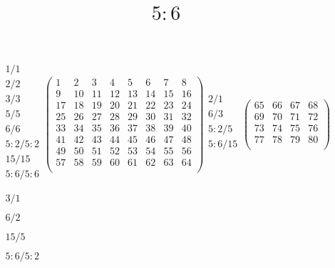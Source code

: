 \documentclass[12pt,a4paper]{amsart}
\title{$5:6$}
\begin{document}
\maketitle

\begin{align*}
\begin{array}{r}%
1/1\\%
2/2\\%
3/3\\%
5/5\\%
6/6\\%
5:2/5:2\\%
15/15\\%
5:6/5:6\\%
\end{array}%
\left(\begin{array}{r|r|r|r|r|r|r|r}%
1&2&3&4&5&6&7&8\\\hline%
9&10&11&12&13&14&15&16\\\hline%
17&18&19&20&21&22&23&24\\\hline%
25&26&27&28&29&30&31&32\\\hline%
33&34&35&36&37&38&39&40\\\hline%
41&42&43&44&45&46&47&48\\\hline%
49&50&51&52&53&54&55&56\\\hline%
57&58&59&60&61&62&63&64\\%
\end{array}\right)%
%
\begin{array}{r}%
2/1\\%
6/3\\%
5:2/5\\%
5:6/15\\%
\end{array}%
\left(\begin{array}{r|r|r|r}%
65&66&67&68\\\hline%
69&70&71&72\\\hline%
73&74&75&76\\\hline%
77&78&79&80\\%
\end{array}\right)%
\\
\begin{array}{r}%
3/1\\%
\\%
6/2\\%
\\%
15/5\\%
\\%
5:6/5:2\\%
\\%

\end{array}
\end{align*}
\end{document}
